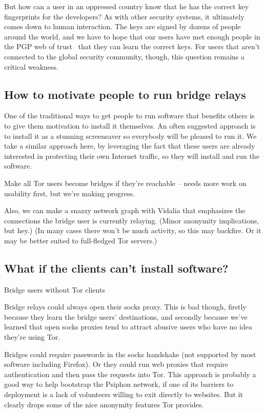 \documentclass{llncs}
\begin{document}
But how can a user in an oppressed country know that he has the correct
key fingerprints for the developers? As with other security systems, it
ultimately comes down to human interaction. The keys are signed by dozens
of people around the world, and we have to hope that our users have met
enough people in the PGP web of trust~\cite{pgp-wot} that they can learn
the correct keys. For users that aren't connected to the global security
community, though, this question remains a critical weakness.


\subsection{How to motivate people to run bridge relays}

One of the traditional ways to get people to run software that benefits
others is to give them motivation to install it themselves.  An often
suggested approach is to install it as a stunning screensaver so everybody
will be pleased to run it. We take a similar approach here, by leveraging
the fact that these users are already interested in protecting their
own Internet traffic, so they will install and run the software.

Make all Tor users become bridges if they're reachable -- needs more work
on usability first, but we're making progress.

Also, we can make a snazzy network graph with Vidalia that emphasizes
the connections the bridge user is currently relaying. (Minor anonymity
implications, but hey.) (In many cases there won't be much activity,
so this may backfire. Or it may be better suited to full-fledged Tor
servers.)

\subsection{What if the clients can't install software?}

Bridge users without Tor clients

Bridge relays could always open their socks proxy. This is bad though,
firstly
because they learn the bridge users' destinations, and secondly because
we've learned that open socks proxies tend to attract abusive users who
have no idea they're using Tor.

Bridges could require passwords in the socks handshake (not supported
by most software including Firefox). Or they could run web proxies
that require authentication and then pass the requests into Tor. This
approach is probably a good way to help bootstrap the Psiphon network,
if one of its barriers to deployment is a lack of volunteers willing
to exit directly to websites. But it clearly drops some of the nice
anonymity features Tor provides.
\end{document}
